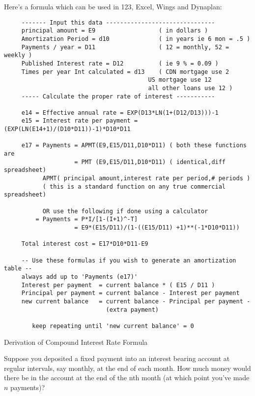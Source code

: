Here's a formula which can be used in 123, Excel, Wings and
    Dynaplan:

\begin{verbatim}
     ------- Input this data -------------------------------
     principal amount = E9                  ( in dollars )
     Amortization Period = d10              ( in years ie 6 mon = .5 )
     Payments / year = D11                  ( 12 = monthly, 52 = weekly )
     Published Interest rate = D12          ( ie 9 % = 0.09 )
     Times per year Int calculated = d13    ( CDN mortgage use 2
                                         US mortgage use 12
                                         all other loans use 12 )
     ----- Calculate the proper rate of interest -----------

     e14 = Effective annual rate = EXP(D13*LN(1+(D12/D13)))-1
     e15 = Interest rate per payment = (EXP(LN(E14+1)/(D10*D11))-1)*D10*D11

     e17 = Payments = APMT(E9,E15/D11,D10*D11) ( both these functions are
                    = PMT (E9,E15/D11,D10*D11) ( identical,diff spreadsheet)
           APMT( principal amount,interest rate per period,# periods )
           ( this is a standard function on any true commercial spreadsheet)

           OR use the following if done using a calculator
         = Payments = P*I/[1-(I+1)^-T]
                    = E9*(E15/D11)/(1-((E15/D11) +1)**(-1*D10*D11))

     Total interest cost = E17*D10*D11-E9

     -- Use these formulas if you wish to generate an amortization table --
     always add up to 'Payments (e17)'
     Interest per payment  = current balance * ( E15 / D11 )
     Principal per payment = current balance - Interest per payment
     new current balance   = current balance - Principal per payment -
                             (extra payment)

        keep repeating until 'new current balance' = 0

\end{verbatim}

            Derivation of Compound Interest Rate Formula

     Suppose you deposited a fixed payment into an interest bearing
     account at regular intervals, say monthly, at the end of each month.
     How much money would there be in the account at the end of the nth
     month (at which point you've made $n$ payments)?

